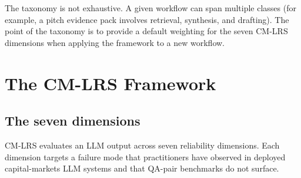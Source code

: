 \documentclass[11pt]{article}
\begin{document}
The taxonomy is not exhaustive. A given workflow can span multiple classes (for example, a pitch evidence pack involves retrieval, synthesis, and drafting). The point of the taxonomy is to provide a default weighting for the seven CM-LRS dimensions when applying the framework to a new workflow.

\section{The CM-LRS Framework}
\label{sec:framework}

\subsection{The seven dimensions}

CM-LRS evaluates an LLM output across seven reliability dimensions. Each dimension targets a failure mode that practitioners have observed in deployed capital-markets LLM systems and that QA-pair benchmarks do not surface.
\end{document}
